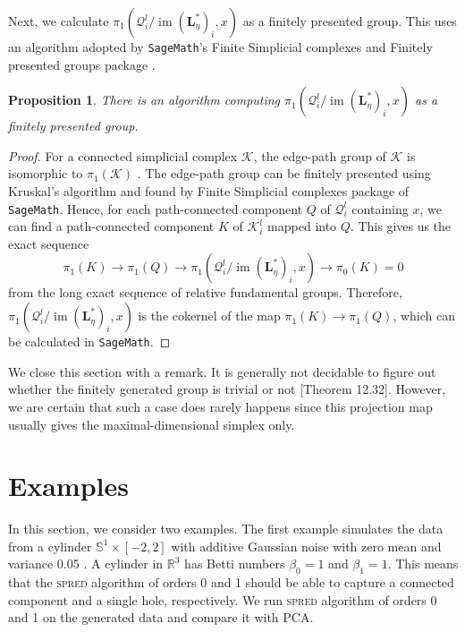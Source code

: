 \documentclass[11pt]{article}
\newtheorem{proposition}[theorem]{Proposition}
\newcommand{\im}{\operatorname{im}}
\newcommand{\matL}{\mathbf{L}} %
\begin{document}
Next, we calculate $\pi_{1}(\mathcal{Q}_{i}^{l}/\im\left(\matL^{\ast}_{\eta}\right)_{i},x)$ as a finitely presented group. This uses an algorithm adopted by \texttt{SageMath}'s Finite Simplicial complexes and Finitely presented groups package \citep{sagemath}. 
\begin{proposition}
	There is an algorithm computing $\pi_{1}(\mathcal{Q}_{i}^{l}/\im\left(\matL^{\ast}_{\eta}\right)_{i},x)$ as a finitely presented group.
\end{proposition}
\begin{proof}
	For a connected simplicial complex $\mathcal{K}$, the edge-path group of $\mathcal{K}$ is isomorphic to $\pi_{1}(\mathcal{K})$ \citep{MR1954333,sagemath}. The edge-path group can be finitely presented using Kruskal's algorithm and found by Finite Simplicial complexes package of \texttt{SageMath}. Hence, for each path-connected component $Q$ of $\mathcal{Q}_{i}^{l}$ containing $x$, we can find a path-connected component $K$ of $\mathcal{K}_{i}^{l}$ mapped into $Q$. This gives us the exact sequence 
	$$\pi_{1}(K) \to \pi_{1}(Q) \to \pi_{1}(\mathcal{Q}_{i}^{l}/\im\left(\matL^{\ast}_{\eta}\right)_{i},x) \to \pi_{0}(K)=0$$ 
	from the long exact sequence of relative fundamental groups. Therefore, $\pi_{1}(\mathcal{Q}_{i}^{l}/\im\left(\matL^{\ast}_{\eta}\right)_{i},x)$ is the cokernel of the map $\pi_{1}(K) \to \pi_{1}(Q)$, which can be calculated in \texttt{SageMath}.
\end{proof}

We close this section with a remark. It is generally not decidable to figure out whether the finitely generated group is trivial or not \citep{MR1307623}[Theorem 12.32]. However, we are certain that such a case does rarely happens since this projection map usually gives the maximal-dimensional simplex only.

\section{Examples}\label{sec:example}

In this section, we consider two examples. The first example simulates the data from a cylinder $\mathbb{S}^1 \times [-2,2]$ with additive Gaussian noise with zero mean and variance 0.05 \citep{kachan_persistent_2020}. A cylinder in $\mathbb{R}^3$ has Betti numbers $\beta_0 = 1$ and $\beta_1 = 1$. This means that the \textsc{spred} algorithm of orders 0 and 1 should be able to capture a connected component and a single hole, respectively. We run \textsc{spred} algorithm of orders 0 and 1 on the generated data and compare it with PCA. 
\end{document}
